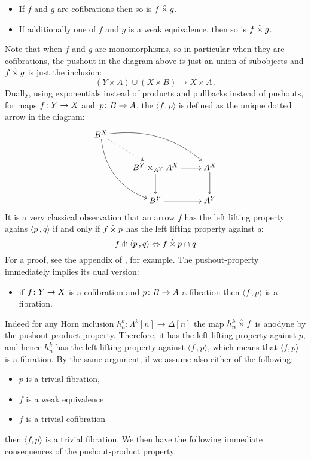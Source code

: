 \documentclass[reqno,10pt,a4paper,oneside,draft]{amsart}
\begin{document}
\begin{itemize}
\item If $f$ and $g$ are cofibrations then so is $f \mathbin{\hat{\times}} g$.
\item If additionally one of $f$ and $g$ is a weak equivalence, then so is $f \mathbin{\hat{\times}} g$.
\end{itemize}
Note that when $f$ and $g$ are monomorphisms, so in particular when they are cofibrations, the pushout in the diagram above is just an union of subobjects and $f \mathbin{\hat{\times}} g$ is just the inclusion:
\[  
(Y \times A) \cup (X \times B) \rightarrow X \times A \, .
\]
Dually, using  exponentials instead of products and pullbacks instead of pushouts, for maps $f \colon Y \rightarrow X$ and~$p \colon B \rightarrow A$, the   $\langle f \, , p \rangle$ is defined as the unique dotted arrow in the diagram:
\[
\xymatrix{
 B^X \ar@{.>}[dr] \ar@/^1.5pc/[drr] \ar@/_1.5pc/[ddr] \\
& B^Y \times_{A^Y} A^X \ar[r] \ar[d] &  A^X \ar[d]  \\
& B^Y \ar[r] & A^Y  \\
 }
 \]
It is a very classical observation that an arrow $f$ has the left lifting property agains $\langle p \, , q \rangle $ if and only if $f \mathbin{\hat{\times}} p$ has the left lifting property against $q$:
\[
f \pitchfork \langle p \, , q \rangle \Leftrightarrow f \mathbin{\hat{\times}} p \pitchfork q 
\]
 For a proof, see the appendix of \cite{joyal-tierney-segal}, for example. The pushout-property immediately implies its dual version: 
\begin{itemize}
\item if $f \colon Y \to X$ is a cofibration and $p \colon B \to A$ a fibration then $\langle f \, , p \rangle$ is a fibration.
\end{itemize}
 Indeed for any Horn inclusion $h^k_n: \Lambda^k[n] \rightarrow \Delta[n]$ the map $h^k_n \mathbin{\hat{\times}} f$ is anodyne by the pushout-product property. Therefore,  it has the left lifting property against $p$, and hence $h^k_n$ has the left lifting property against $\langle f \, , p  \rangle$, which means that   $\langle f, p \rangle$ is a fibration. By the same argument, if we  assume also either of the following:
\begin{itemize}
\item $p$ is a trivial fibration,
\item $f$ is a weak equivalence
\item $f$ is a trivial cofibration 
\end{itemize}
then $\langle f , p \rangle$ is a trivial fibration.  We then have the following immediate consequences of the pushout-product property.
\end{document}
